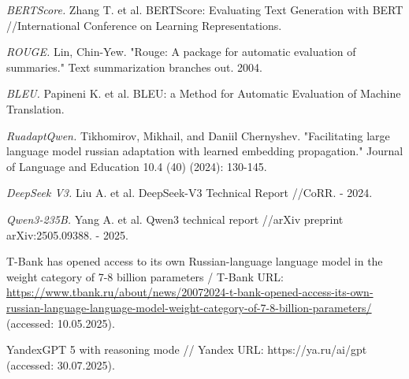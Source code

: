 \documentclass{superfri}
\begin{document}
\begin{thebibliography}{99}
\textit{BERTScore.}
Zhang T. et al. BERTScore: Evaluating Text Generation with BERT //International Conference on Learning Representations.

\textit{ROUGE.}
Lin, Chin-Yew. "Rouge: A package for automatic evaluation of summaries." Text summarization branches out. 2004.

\textit{BLEU.}
Papineni K. et al. BLEU: a Method for Automatic Evaluation of Machine Translation.

\textit{RuadaptQwen.}
Tikhomirov, Mikhail, and Daniil Chernyshev. "Facilitating large language model russian adaptation with learned embedding propagation." Journal of Language and Education 10.4 (40) (2024): 130-145.

\textit{DeepSeek V3.}
Liu A. et al. DeepSeek-V3 Technical Report //CoRR. - 2024.

\textit{Qwen3-\allowbreak 235B.}
Yang A. et al. Qwen3 technical report //arXiv preprint arXiv:2505.09388. - 2025.

T-Bank has opened access to its own Russian-language language model in the weight category of 7-8 billion parameters / T-Bank URL: \url{https://www.tbank.ru/about/news/20072024-t-bank-opened-access-its-own-russian-language-language-model-weight-category-of-7-8-billion-parameters/} (accessed: 10.05.2025).

YandexGPT 5 with reasoning mode // Yandex URL: https://ya.ru/ai/gpt (accessed: 30.07.2025).

\end{thebibliography}
\end{document}
